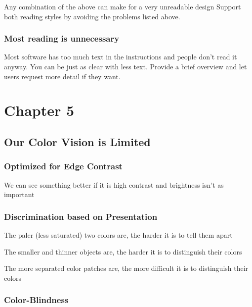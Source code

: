 \documentclass[11pt,]{article}
\begin{document}
Any combination of the above can make for a very unreadable design
Support both reading styles by avoiding the problems listed above.

\hypertarget{most-reading-is-unnecessary}{%
\subsubsection{Most reading is
unnecessary}\label{most-reading-is-unnecessary}}

Most software has too much text in the instructions and people don't
read it anyway. You can be just as clear with less text. Provide a brief
overview and let users request more detail if they want.

\hypertarget{chapter-5}{%
\section{Chapter 5}\label{chapter-5}}

\hypertarget{our-color-vision-is-limited}{%
\subsection{Our Color Vision is
Limited}\label{our-color-vision-is-limited}}

\hypertarget{optimized-for-edge-contrast}{%
\subsubsection{Optimized for Edge
Contrast}\label{optimized-for-edge-contrast}}

We can see something better if it is high contrast and brightness isn't
as important

\hypertarget{discrimination-based-on-presentation}{%
\subsubsection{Discrimination based on
Presentation}\label{discrimination-based-on-presentation}}

The paler (less saturated) two colors are, the harder it is to tell them
apart

The smaller and thinner objects are, the harder it is to distinguish
their colors

The more separated color patches are, the more difficult it is to
distinguish their colors

\hypertarget{color-blindness}{%
\subsubsection{Color-Blindness}\label{color-blindness}}
\end{document}
